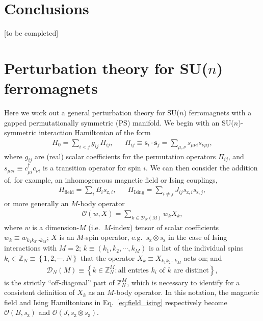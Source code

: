 \documentclass[nofootinbib,twocolumn]{revtex4-2}
\renewcommand{\t}{\text} %
\newcommand{\p}[1]{\left(#1\right)} %
\renewcommand{\set}[1]{\left\{#1\right\}} %
\renewcommand{\v}{\bm} %
\renewcommand{\c}{\cdot} %
\newcommand{\1}{\mathds{1}}
\newcommand{\z}{\text{z}}
\newcommand{\ZZ}{\mathbb{Z}}
\newcommand{\D}{\mathcal{D}}
\renewcommand{\O}{\mathcal{O}}
\newcommand{\red}[1]{{\color{red} #1}}
\begin{document}
\section{Conclusions}

\red{[to be completed]}




\onecolumngrid
\appendix

\section{Perturbation theory for SU($n$) ferromagnets}
\label{sec:pert_theory}

Here we work out a general perturbation theory for SU($n$) ferromagnets with a gapped permutationally symmetric (PS) manifold.
We begin with an SU($n$)-symmetric interaction Hamiltonian of the form
\begin{align}
  H_0 = \sum_{i<j} g_{ij} \, \Pi_{ij},
  &&
  \Pi_{ij} \equiv \v s_i\c\v s_j
  = \sum_{\mu,\nu} s_{\mu\nu i} s_{\nu\mu j},
  \label{eq:H_0}
\end{align}
where $g_{ij}$ are (real) scalar coefficients for the permutation operators $\Pi_{ij}$, and $s_{\mu\nu i}\equiv c_{\mu i}^\dag c_{\nu i}$ is a transition operator for spin $i$.
We can then consider the addition of, for example, an inhomogeneous magnetic field or Ising couplings,
\begin{align}
  H_{\t{field}} = \sum_i B_i s_{\z,i},
  &&
  H_{\t{Ising}} = \sum_{i\ne j} J_{ij} s_{\z,i} s_{\z,j},
  \label{eq:field_ising}
\end{align}
or more generally an $M$-body operator
\begin{align}
  \O\p{w,X} = \sum_{k\in\D_N\p{M}} w_k X_k,
\end{align}
where $w$ is a dimension-$M$ (i.e.~$M$-index) tensor of scalar
coefficients $w_k\equiv w_{k_1k_2\cdots k_M}$; $X$ is an $M$-spin
operator, e.g.~$s_\z\otimes s_\z$ in the case of Ising interactions
with $M=2$; $k\equiv\p{k_1,k_2,\cdots,k_M}$ is a list of the
individual spins $k_i\in\ZZ_N\equiv\set{1,2,\cdots,N}$ that the operator $X_k\equiv X_{k_1k_2\cdots k_M}$ acts on; and
\begin{align}
  \D_N\p{M} \equiv
  \set{ k \in \ZZ_N^M : \t{all entries $k_i$ of $k$ are distinct} },
\end{align}
is the strictly ``off-diagonal'' part of $\ZZ_N^M$, which is necessary to identify for a consistent definition of $X_k$ as an $M$-body operator.
In this notation, the magnetic field and Ising Hamiltonians in Eq.~\eqref{eq:field_ising} respectively become $\O\p{B,s_{\z}}$ and $\O\p{J,s_\z\otimes s_\z}$.
\end{document}

